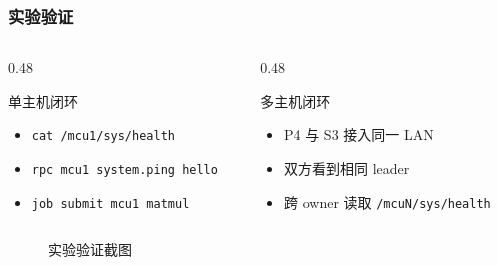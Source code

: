 \documentclass[aspectratio=169]{ctexbeamer}
\begin{document}
\begin{frame}
  \frametitle{实验验证}
  \begin{columns}[T]
    \begin{column}{0.48\textwidth}
      \begin{block}{单主机闭环}
        \small
        \begin{itemize}
          \item \texttt{cat /mcu1/sys/health}
          \item \texttt{rpc mcu1 system.ping hello}
          \item \texttt{job submit mcu1 matmul}
        \end{itemize}
      \end{block}
    \end{column}
    \begin{column}{0.48\textwidth}
      \begin{block}{多主机闭环}
        \small
        \begin{itemize}
        \frametitle{主机侧架构}  \item P4 与 S3 接入同一 LAN
          \item 双方看到相同 leader
          \item 跨 owner 读取 \texttt{/mcuN/sys/health}
        \end{itemize}
      \end{block}
    \end{column}
  \end{columns}
  \vspace{0.3cm}
  \begin{figure}
    \centering
    \caption{实验验证截图}
  \end{figure}
\end{frame}
\end{document}
